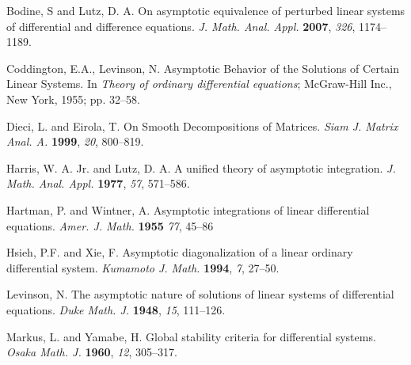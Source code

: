 \documentclass[a4paper,11pt]{article}
\theoremstyle{remark}
\begin{document}
\begin{thebibliography}{999}

Bodine, S and Lutz, D. A. On asymptotic equivalence of perturbed linear systems of differential and difference equations. {\em J. Math. Anal. Appl.} {\bf 2007}, {\em 326}, 1174--1189.


Coddington, E.A., Levinson, N. Asymptotic Behavior of the Solutions of Certain Linear Systems. In {\em Theory of ordinary differential equations}; McGraw-Hill Inc., New York, 1955; pp. 32--58.

Dieci, L. and Eirola, T. On Smooth Decompositions of Matrices. {\em Siam J. Matrix Anal. A.} {\bf 1999}, {\em 20}, 800--819.


Harris, W. A. Jr. and Lutz, D. A. A unified theory of asymptotic integration. {\em J. Math. Anal. Appl.} {\bf 1977}, {\em 57}, 571--586.


Hartman, P. and Wintner, A. Asymptotic integrations of linear differential equations. {\em Amer. J. Math.} {\bf 1955} {\em 77}, 45--86


Hsieh, P.F.  and Xie, F. Asymptotic diagonalization of a linear ordinary differential system. {\em Kumamoto J. Math.} {\bf 1994}, {\em 7}, 27--50.


Levinson, N. The asymptotic nature of solutions of linear systems of differential equations. {\em Duke Math. J.} {\bf 1948}, {\em 15}, 111--126.

Markus, L. and Yamabe, H. Global stability criteria for differential systems. {\em Osaka Math. J.} {\bf 1960}, {\em 12}, 305--317.




\end{thebibliography}
\end{document}
